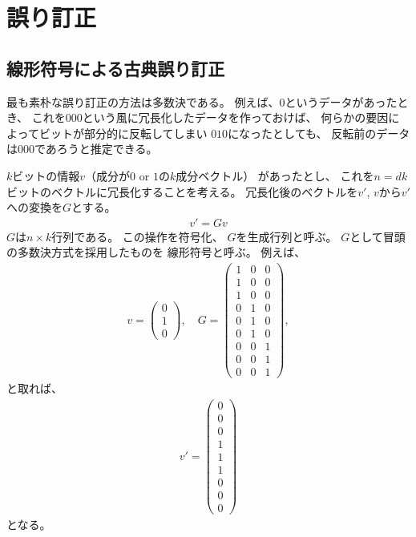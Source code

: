 \documentclass[]{ltjsarticle}
\begin{document}
\section{誤り訂正}
\subsection{線形符号による古典誤り訂正}
最も素朴な誤り訂正の方法は多数決である。
例えば、$0$というデータがあったとき、
これを$000$という風に冗長化したデータを作っておけば、
何らかの要因によってビットが部分的に反転してしまい
$010$になったとしても、
反転前のデータは$000$であろうと推定できる。

$k$ビットの情報$v$（成分が$0$ or $1$の$k$成分ベクトル）
があったとし、
これを$n = dk$ビットのベクトルに冗長化することを考える。
冗長化後のベクトルを$v'$, $v$から$v'$への変換を$G$とする。 
\begin{align}
    v' = Gv
\end{align}
$G$は$n \times k$行列である。
この操作を符号化、
$G$を生成行列と呼ぶ。
$G$として冒頭の多数決方式を採用したものを
線形符号と呼ぶ。
例えば、
\begin{align}
    v 
    =
    \begin{pmatrix}
        0 \\ 1 \\ 0
    \end{pmatrix},
    \quad 
    G
    =
    \begin{pmatrix}
        1 & 0 & 0 \\
        1 & 0 & 0 \\
        1 & 0 & 0 \\
        0 & 1 & 0 \\
        0 & 1 & 0 \\
        0 & 1 & 0 \\
        0 & 0 & 1 \\
        0 & 0 & 1 \\
        0 & 0 & 1
    \end{pmatrix},
\end{align}
と取れば、
\begin{align}
    v' = 
    \begin{pmatrix}
        0 \\ 0 \\ 0 \\ 
        1 \\ 1 \\ 1 \\ 
        0 \\ 0 \\ 0
    \end{pmatrix}
\end{align}
となる。
\end{document}

